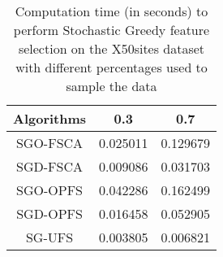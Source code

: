 \begin{table}
	\begin{center}
		\begin{tabular}{c c c}
			Algorithms & 0.3 & 0.7 \\
			\hline
			SGO-FSCA & 0.025011 & 0.129679 \\
			SGD-FSCA & 0.009086 & 0.031703 \\
			SGO-OPFS & 0.042286 & 0.162499 \\
			SGD-OPFS & 0.016458 & 0.052905 \\
			SG-UFS & 0.003805 & 0.006821 \\
		\end{tabular}
	\end{center}
	\caption{Computation time (in seconds) to perform Stochastic Greedy feature selection on the X50sites dataset with different percentages used to sample the data}
\end{table}